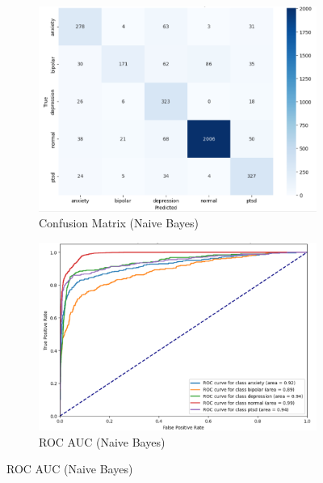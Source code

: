 \begin{figure}[h!]
    \centering
    \begin{subfigure}[b]{0.49\textwidth}
        \centering
        \includegraphics[width=\textwidth]{Images/NB Confusion Matrix.png}
        \caption*{Confusion Matrix (Naive Bayes)}
        \label{NBCM}  %
    \end{subfigure}
    \hfill
    \begin{subfigure}[b]{0.49\textwidth}
        \centering
        \includegraphics[width=\textwidth]{Images/NB ROC.png}
        \caption*{ROC AUC (Naive Bayes)}
        \label{NBROC}  %
    \end{subfigure}
    \label{fig:nb_comparison}
\end{figure}


